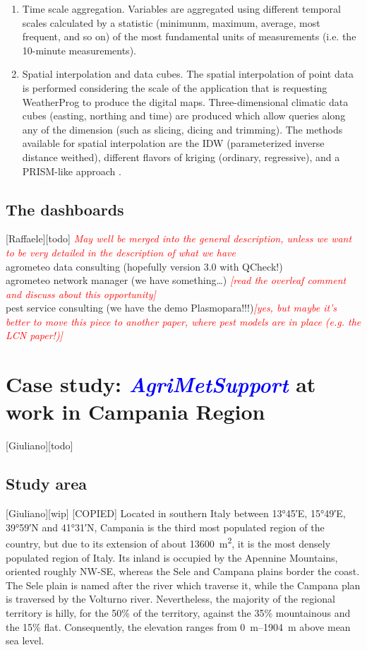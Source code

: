 \documentclass[authoryear,preprint,review,12pt]{elsarticle}
\newcommand{\note}[1]{\emph{\textcolor{red}{#1}}}
\newcommand{\update}[1]{\emph{\textcolor{blue}{#1}}}
\newcommand{\gci}{\update{AgriMetSupport}\xspace}
\begin{document}
\begin{enumerate}
    \item Time scale aggregation. Variables are aggregated using different temporal scales calculated by a statistic (minimunm, maximum, average, most frequent, and so on) of the most fundamental units of measurements (i.e. the 10-minute  measurements).
    
    \item Spatial interpolation and data cubes. The spatial interpolation of point data is performed considering the scale of the application that is requesting WeatherProg to produce the digital maps.
    Three-dimensional climatic data cubes (easting, northing and time) are produced which allow queries along any of the dimension (such as slicing, dicing and trimming). The methods available for spatial interpolation are the IDW (parameterized inverse distance weithed), different flavors of kriging (ordinary, regressive), and a PRISM-like approach \citep{Daly08_PRISM_USA}.
\end{enumerate}

\subsection{The dashboards}[Raffaele][todo]
\note{May well be merged into the general description, unless we want to be very detailed in the description of what we have}\\
agrometeo data consulting (hopefully version 3.0 with QCheck!)\\
agrometeo network manager (we have something\ldots) \note{[read the overleaf comment and discuss about this opportunity]}\\
pest service consulting (we have the demo Plasmopara!!!)\note{[yes, but maybe it's better to move this piece to another paper, where pest models are in place (e.g. the LCN paper!)]}\\

\section{Case study: \gci at work in Campania Region}[Giuliano][todo]

\subsection{Study area}[Giuliano][wip]
[COPIED] Located in southern Italy between \ang{13;45;}E, \ang{15;49;}E, \ang{39;59;}N and \ang{41;31;}N, Campania is the third most populated region of the country, but due to its extension of about \SI{13600}{\metre\squared}, it is the most densely populated region of Italy.
Its inland is occupied by the Apennine Mountains, oriented roughly NW-SE, whereas the Sele and Campana plains border the coast.
The Sele plain is named after the river which traverse it, while the Campana plan is traversed by the Volturno river.
Nevertheless, the majority of the regional territory is hilly, for the 50\% of the territory, against the 35\% mountainous and the 15\% flat.
Consequently, the elevation ranges from \SIrange{0}{1904}{\metre} above mean sea level.
\end{document}
